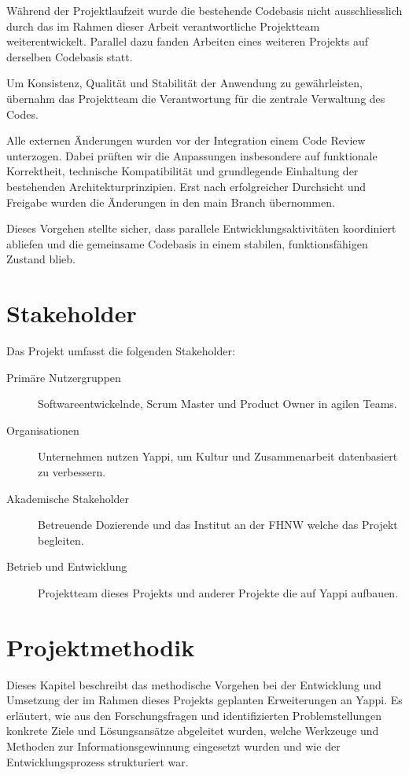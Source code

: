 \documentclass[12pt,a4paper]{report}
\begin{document}
Während der Projektlaufzeit wurde die bestehende Codebasis nicht ausschliesslich durch das im Rahmen dieser Arbeit verantwortliche
Projektteam weiterentwickelt. Parallel dazu fanden Arbeiten eines weiteren Projekts auf derselben Codebasis statt. 

Um Konsistenz, Qualität und Stabilität der Anwendung zu gewährleisten, übernahm das Projektteam die Verantwortung für die zentrale
Verwaltung des Codes.

Alle externen Änderungen wurden vor der Integration einem Code Review unterzogen. Dabei prüften wir die Anpassungen insbesondere
auf funktionale Korrektheit, technische Kompatibilität und grundlegende Einhaltung der bestehenden Architekturprinzipien. Erst
nach erfolgreicher Durchsicht und Freigabe wurden die Änderungen in den main Branch übernommen.

Dieses Vorgehen stellte sicher, dass parallele Entwicklungsaktivitäten koordiniert abliefen und die gemeinsame Codebasis in einem
stabilen, funktionsfähigen Zustand blieb.

\section{Stakeholder}

Das Projekt umfasst die folgenden Stakeholder:

\begin{description}
  \item[Primäre Nutzergruppen] Softwareentwickelnde, Scrum Master und Product Owner in agilen Teams. 
  \item[Organisationen] Unternehmen nutzen Yappi, um Kultur und Zusammenarbeit datenbasiert zu verbessern.
  \item[Akademische Stakeholder] Betreuende Dozierende und das Institut an der FHNW welche das Projekt begleiten.
  \item[Betrieb und Entwicklung] Projektteam dieses Projekts und anderer Projekte die auf Yappi aufbauen.
\end{description}

\section{Projektmethodik}

Dieses Kapitel beschreibt das methodische Vorgehen bei der Entwicklung und Umsetzung der im Rahmen dieses Projekts geplanten
Erweiterungen an Yappi. Es erläutert, wie aus den Forschungsfragen und identifizierten Problemstellungen konkrete Ziele und
Lösungsansätze abgeleitet wurden, welche Werkzeuge und Methoden zur Informationsgewinnung eingesetzt wurden und wie der
Entwicklungsprozess strukturiert war.
\end{document}
